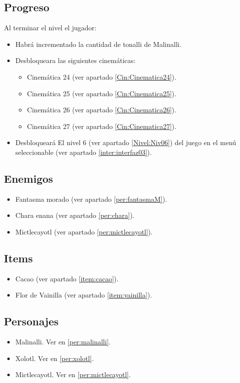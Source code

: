         \subsection{Progreso}
        Al terminar el nivel el jugador:
\begin{itemize}
        \item Habrá incrementado la cantidad de tonalli de Malinalli. 
        \item Desbloqueara las siguientes cinemáticas:
\begin{itemize}
        \item Cinemática 24 (ver apartado \ref{Cin:Cinematica24}). 
        \item Cinemática 25 (ver apartado \ref{Cin:Cinematica25}).
        \item Cinemática 26 (ver apartado \ref{Cin:Cinematica26}).
        \item Cinemática 27 (ver apartado \ref{Cin:Cinematica27}).
\end{itemize}
        \item Desbloqueará El nivel 6 (ver apartado  \ref{Nivel:Niv06}) del juego en el menú seleccionable (ver apartado \ref{inter:interfaz03}).
\end{itemize}

        \subsection{Enemigos}
\begin{itemize}
        \item Fantasma morado (ver apartado \ref{per:fantasmaM}).
        
        \item Chara enana  (ver apartado \ref{per:chara}).
        
		\item Mictlecayotl (ver apartado \ref{per:mictlecayotl}).
			
\end{itemize}
        \subsection{Items}
\begin{itemize}
        \item   Cacao (ver apartado \ref{item:cacao}).
        \item Flor de Vainilla (ver apartado \ref{item:vainilla}).
\end{itemize}
        \subsection{Personajes}
        \begin{itemize}
                \item Malinalli. Ver en \ref{per:malinalli}.
                
                \item Xolotl. Ver en \ref{per:xolotl}.
              
                \item Mictlecayotl. Ver en \ref{per:mictlecayotl}.
                
        \end{itemize}
